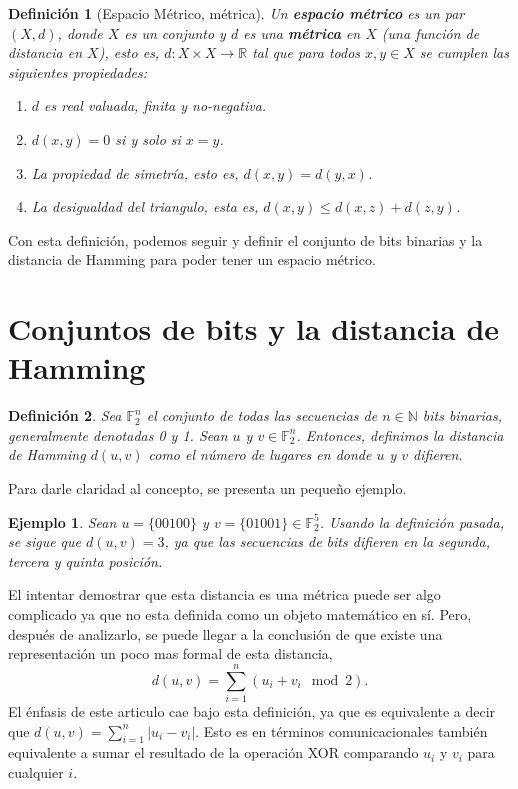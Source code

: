 \documentclass[spanish,twoside]{book}
\newtheorem{definition}{Definición}
\newtheorem*{example}{Ejemplo}
\begin{document}
	\begin{definition}[Espacio Métrico, métrica] Un \textbf{espacio métrico} es un par $(X,d)$, donde $X$ es un conjunto y $d$ es una \textbf{métrica} en $X$ (una función de distancia en $X$), esto es, $d: X \times X \rightarrow \mathbb{R}$ tal que para todos $x,y \in X$ se cumplen las siguientes propiedades: 
		\begin{enumerate}
			\item $d$ es real valuada, finita y no-negativa. 
			\item $d(x,y) = 0$ si y solo si $x=y$. 
			\item La propiedad de simetría, esto es, $d(x,y)=d(y,x)$. 
			\item La desigualdad del triangulo, esta es, $d(x,y) \leq d(x,z) + d(z,y)$. 
		\end{enumerate}
	\end{definition}

Con esta definición, podemos seguir y definir el conjunto de bits binarias y la distancia de Hamming para poder tener un espacio métrico. 

\section*{Conjuntos de bits y la distancia de Hamming}

\begin{definition}
	Sea $\mathbb{F}^n_2$ el conjunto de todas las secuencias de $n \in \mathbb{N}$ bits binarias, generalmente denotadas 0 y 1. Sean $u$ y $v \in \mathbb{F}^n_2$. Entonces, definimos la distancia de Hamming  $d(u,v)$ como el número de lugares en donde $u$ y $v$ difieren. 
\end{definition}
	
Para darle claridad al concepto, se presenta un pequeño ejemplo. 
\begin{example}
	Sean $u = \{ 00100 \}$ y $v = \{ 01001 \} \in \mathbb{F}^5_2$. Usando la definición pasada, se sigue que $d(u,v) = 3$, ya que las secuencias de bits difieren en la segunda, tercera y quinta posición. 
\end{example}

El intentar demostrar que esta distancia es una métrica puede ser algo complicado ya que no esta definida como un objeto matemático en sí. Pero, después de analizarlo, se puede llegar a la conclusión de que existe una representación un poco mas formal de esta distancia,
\begin{equation}
	d(u,v) = \sum_{i=1}^n (u_i + v_i \mod 2).
	\label{Hamming}
\end{equation}
El énfasis de este articulo cae bajo esta definición, ya que es equivalente a decir que $d(u,v) = \sum_{i=1}^n |u_i - v_i|$. Esto es en términos comunicacionales también equivalente a sumar el resultado de la operación XOR comparando $u_i$ y $v_i$ para cualquier $i$. 
\end{document}
